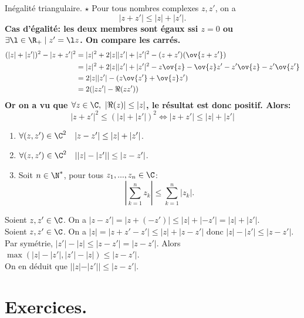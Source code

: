 \documentclass[11pt]{article}
\begin{document}
\begin{prop}{Inégalité triangulaire. $\star$}{}
    Pour tous nombres complexes $z,z'$, on a
    \begin{equation*}
        |z+z'|\leq|z|+|z'|.
    \end{equation*}
    \bf{Cas d'égalité:} les deux membres sont égaux ssi $z=0$ ou $\exists \l \in \R_+\mid z'=\l z$.
    \tcblower
    On compare les carrés.
    \begin{align*}
        (|z|+|z'|)^2-|z+z'|^2&=|z|^2+2|z||z'|+|z'|^2-(z+z')(\ov{z+z'})\\
        &=|z|^2+2|z||z'|+|z'|^2-z\ov{z}-\ov{z}z'-z'\ov{z}-z'\ov{z'}\\
        &=2|z||z'|-(z\ov{z'}+\ov{z}z')\\
        &=2(|zz'|-\Re(zz'))
    \end{align*}
    Or on a vu que $\forall z \in \C, ~ |\Re(z)|\leq|z|$, le résultat est donc positif. Alors:
    \begin{equation*}
        |z+z'|^2\leq(|z|+|z'|)^2 \iff |z+z'|\leq|z|+|z'|
    \end{equation*}
\end{prop}

\begin{corr}{}{}
    \begin{enumerate}
        \item $\forall (z,z')\in\C^2\quad|z-z'|\leq|z|+|z'|$.
        \item $\forall (z,z')\in\C^2\quad||z|-|z'||\leq|z-z'|$.
        \item Soit $n\in\N^*$, pour tous $z_1,...,z_n\in\C$:
        \begin{equation*}
            \left|\sum_{k=1}^nz_k\right|\leq\sum_{k=1}^n|z_k|.
        \end{equation*}
    \end{enumerate}
    \tcblower
     Soient $z,z'\in\C$. On a $|z-z'|=|z+(-z')|\leq|z|+|-z'|=|z|+|z'|$.\\
     Soient $z,z'\in\C$. On a $|z|=|z+z'-z'|\leq|z|+|z-z'|$ donc $|z|-|z'|\leq|z-z'|$.\\
    Par symétrie, $|z'|-|z|\leq|z-z'|=|z-z'|$. Alors $\max(|z|-|z'|,|z'|-|z|)\leq |z-z'|$.\\
    On en déduit que $||z|-|z'||\leq|z-z'|$.
\end{corr}

\section{Exercices.}
\end{document}
